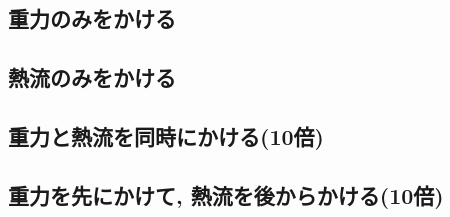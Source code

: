 



\subsection{重力のみをかける}





\subsection{熱流のみをかける}





\subsection{重力と熱流を同時にかける(10倍)}



\subsection{重力を先にかけて, 熱流を後からかける(10倍)}



